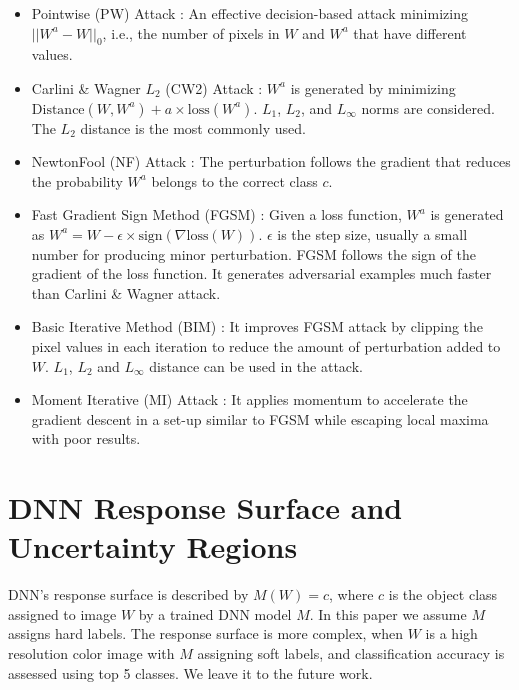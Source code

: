 \documentclass[12pt]{article}
\begin{document}
\begin{itemize}
\item Pointwise (PW) Attack \cite{foolbox-2017}: An effective
  decision-based attack minimizing $||W^a-W||_0$, i.e., the number of
  pixels in $W$ and $W^a$ that have different values.    

\item Carlini \& Wagner $L_2$ (CW2) Attack \cite{CW2-attack-2017}:
  $W^a$ is generated by minimizing $\textrm{Distance}(W,W^a) + a 
  \times \textrm{loss}(W^a)$. $L_1$, $L_2$, and $L_{\infty}$ norms are
  considered. The $L_2$ distance is the most commonly used.   

\item NewtonFool (NF) Attack \cite{NewtonFool-attack-2017}: The
  perturbation follows the gradient that reduces the probability $W^a$
  belongs to the correct class $c$. 


\item Fast Gradient Sign Method (FGSM) \cite{explain-adexample-2015}:
  Given a loss function,   
  $W^a$ is generated as $W^a = W - \epsilon\times 
  \textrm{sign}(\nabla \textrm{loss}(W))$. $\epsilon$ is the
  step size, usually a small number for producing minor
  perturbation. FGSM follows the sign of the gradient of the loss
  function. It generates adversarial examples much faster than Carlini
  \& Wagner attack.    

\item Basic Iterative Method (BIM)  \cite{BIM-attack-2017}: It
  improves FGSM attack by clipping the pixel values in each iteration
  to reduce the amount of perturbation added to $W$. $L_1$, $L_2$ and
  $L_{\infty}$ distance can be used in the attack. 
 
\item Moment Iterative (MI) Attack
  \cite{moment-iterative-attack-2018}: It applies momentum to
  accelerate the gradient descent in a set-up similar to FGSM while
  escaping local maxima with poor results.  
  
\end{itemize}

%
\section{DNN Response Surface and Uncertainty Regions}
\label{sec:uncertain}

DNN's response surface is described by $M(W)=c$, where $c$ is the
object class assigned to image $W$ by a trained DNN model $M$. In this
paper we assume $M$ assigns hard labels. The
response surface is more complex, when $W$ is a high
resolution color image with $M$ 
assigning soft labels, and classification accuracy is assessed using top 5
classes. We leave it to the future work. 
\end{document}
